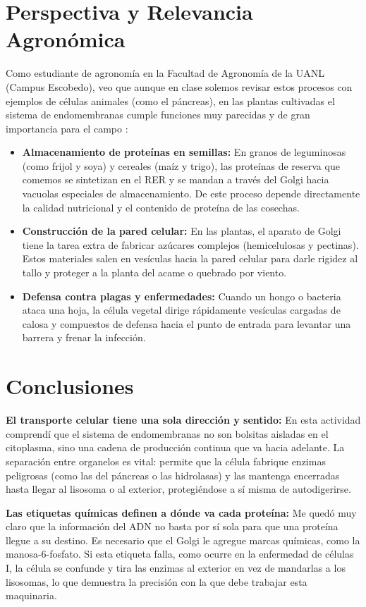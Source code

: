 \documentclass[spanish,letterpaper,oneside]{article}
\begin{document}
\section{Perspectiva y Relevancia Agronómica}
Como estudiante de agronomía en la Facultad de Agronomía de la UANL (Campus Escobedo), veo que aunque en clase solemos revisar estos procesos con ejemplos de células animales (como el páncreas), en las plantas cultivadas el sistema de endomembranas cumple funciones muy parecidas y de gran importancia para el campo \parencite{taiz2015plant}:
\begin{itemize}
    \item \textbf{Almacenamiento de proteínas en semillas:} En granos de leguminosas (como frijol y soya) y cereales (maíz y trigo), las proteínas de reserva que comemos se sintetizan en el RER y se mandan a través del Golgi hacia vacuolas especiales de almacenamiento. De este proceso depende directamente la calidad nutricional y el contenido de proteína de las cosechas.
    \item \textbf{Construcción de la pared celular:} En las plantas, el aparato de Golgi tiene la tarea extra de fabricar azúcares complejos (hemicelulosas y pectinas). Estos materiales salen en vesículas hacia la pared celular para darle rigidez al tallo y proteger a la planta del acame o quebrado por viento.
    \item \textbf{Defensa contra plagas y enfermedades:} Cuando un hongo o bacteria ataca una hoja, la célula vegetal dirige rápidamente vesículas cargadas de calosa y compuestos de defensa hacia el punto de entrada para levantar una barrera y frenar la infección.
\end{itemize}

\clearpage

\section{Conclusiones}

\textbf{El transporte celular tiene una sola dirección y sentido:} En esta actividad comprendí que el sistema de endomembranas no son bolsitas aisladas en el citoplasma, sino una cadena de producción continua que va hacia adelante. La separación entre organelos es vital: permite que la célula fabrique enzimas peligrosas (como las del páncreas o las hidrolasas) y las mantenga encerradas hasta llegar al lisosoma o al exterior, protegiéndose a sí misma de autodigerirse.

\textbf{Las etiquetas químicas definen a dónde va cada proteína:} Me quedó muy claro que la información del ADN no basta por sí sola para que una proteína llegue a su destino. Es necesario que el Golgi le agregue marcas químicas, como la manosa-6-fosfato. Si esta etiqueta falla, como ocurre en la enfermedad de células I, la célula se confunde y tira las enzimas al exterior en vez de mandarlas a los lisosomas, lo que demuestra la precisión con la que debe trabajar esta maquinaria.
\end{document}
